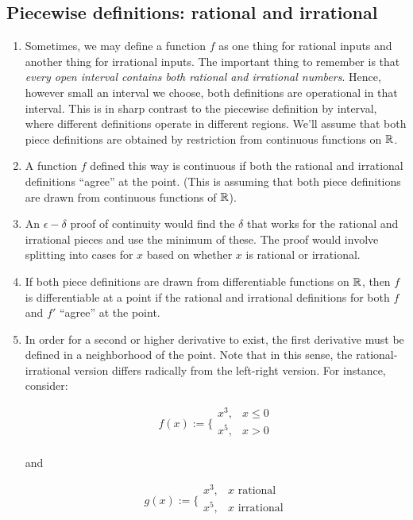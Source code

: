 \documentclass[10pt]{amsart}
\begin{document}
\subsection{Piecewise definitions: rational and irrational}

\begin{enumerate}
\item Sometimes, we may define a function $f$ as one thing for
  rational inputs and another thing for irrational inputs. The
  important thing to remember is that {\em every open interval
  contains both rational and irrational numbers}. Hence, however small
  an interval we choose, both definitions are operational in that
  interval. This is in sharp contrast to the piecewise definition by
  interval, where different definitions operate in different regions.
  We'll assume that both piece definitions are obtained by restriction
  from continuous functions on $\mathbb{R}$.
\item A function $f$ defined this way is continuous if both the
  rational and irrational definitions ``agree'' at the point. (This is
  assuming that both piece definitions are drawn from continuous
  functions of $\mathbb{R}$).
\item An $\epsilon-\delta$ proof of continuity would find the $\delta$
  that works for the rational and irrational pieces and use the
  minimum of these. The proof would involve splitting into cases for
  $x$ based on whether $x$ is rational or irrational.
\item If both piece definitions are drawn from differentiable
  functions on $\mathbb{R}$, then $f$ is differentiable at a point if the
  rational and irrational definitions for both $f$ and $f'$ ``agree''
  at the point.
\item In order for a second or higher derivative to exist, the first
  derivative must be defined in a neighborhood of the point. Note that
  in this sense, the rational-irrational version differs radically
  from the left-right version. For instance, consider:

  $$f(x) := \lbrace\begin{array}{rl}x^3, & x \le 0\\ x^5, & x > 0 \\\end{array}$$

  and

  $$g(x) := \lbrace\begin{array}{rl}x^3, & x \text{ rational}\\ x^5, & x \text{ irrational} \\\end{array}$$


\end{enumerate}
\end{document}
